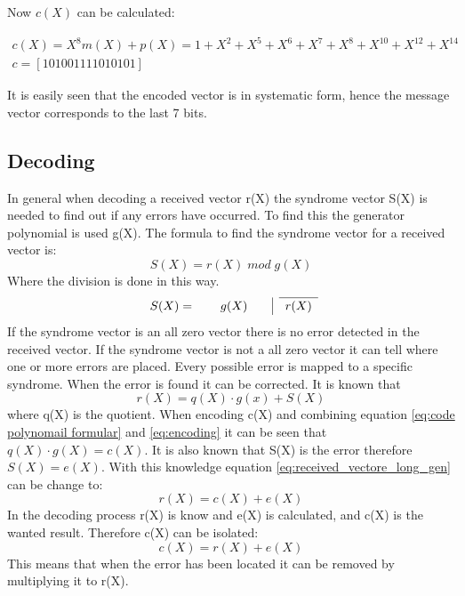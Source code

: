 \documentclass[Main]{subfiles}
\begin{document}
\noindent Now $c(X)$ can be calculated:

\begin{align}
c(X) = X^8m(X)+p(X) = 1 + X^2 + X^5 + X^6 + X^7 + X^8 + X^{10}+ X^{12} + X^{14} \\
c = [1 0 1 0 0 1 1 1 1 0 1 0 1 0 1]
\end{align}

\noindent It is easily seen that the encoded vector is in systematic form, hence the message vector corresponds to the last 7 bits.

\subsection{Decoding}
In general when decoding a received vector r(X) the syndrome vector S(X) is needed to find out if any errors have occurred.
To find this the generator polynomial is used g(X).
The formula to find the syndrome vector for a received vector is:
\begin{equation}
S(X) = r(X) \; mod \; g(X)
\label{syndrom formular}
\end{equation}
Where the division is done in this way. 
\[
\renewcommand\arraystretch{1.2}
\begin{array}{cccccccccccccccccc}
\cline{2-2}
 S(X) = \qquad g(X) \qquad \vline & r(X) \\
\end{array}
\]
If the syndrome vector is an all zero vector there is no error detected in the received vector.
If the syndrome vector is not a all zero vector it can tell where one or more errors are placed.
Every possible error is mapped to a specific syndrome.
When the error is found it can be corrected.
It is known that
\begin{equation}
\label{eq:received_vectore_long_gen}
r(X) = q(X) \cdot g(x) + S(X)
\end{equation}
where q(X) is the quotient.
When encoding c(X) and combining equation \ref{eq:code polynomail formular} and \ref{eq:encoding} it can be seen that $q(X) \cdot g(X) = c(X)$.
It is also known that S(X) is the error therefore $S(X) = e(X)$.
With this knowledge equation \ref{eq:received_vectore_long_gen} can be change to:
\begin{equation}
r(X) = c(X) + e(X)
\end{equation}
In the decoding process r(X) is know and e(X) is calculated, and c(X) is the wanted result.
Therefore c(X) can be isolated:
\begin{equation}
c(X) = r(X) + e(X)
\end{equation}
This means that when the error has been located it can be removed by multiplying it to r(X).
\end{document}
